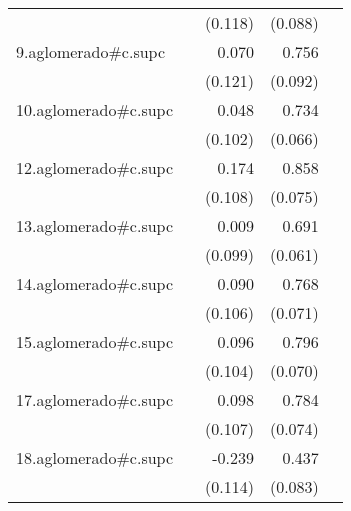 {\begin{longtable}{l*{4}{D{.}{.}{-1}}}
            &                     &     (0.118)         &     (0.088)         &                     \\
\addlinespace
9.aglomerado#c.supc&                     &       0.070         &       0.756\sym{***}&                     \\
            &                     &     (0.121)         &     (0.092)         &                     \\
\addlinespace
10.aglomerado#c.supc&                     &       0.048         &       0.734\sym{***}&                     \\
            &                     &     (0.102)         &     (0.066)         &                     \\
\addlinespace
12.aglomerado#c.supc&                     &       0.174         &       0.858\sym{***}&                     \\
            &                     &     (0.108)         &     (0.075)         &                     \\
\addlinespace
13.aglomerado#c.supc&                     &       0.009         &       0.691\sym{***}&                     \\
            &                     &     (0.099)         &     (0.061)         &                     \\
\addlinespace
14.aglomerado#c.supc&                     &       0.090         &       0.768\sym{***}&                     \\
            &                     &     (0.106)         &     (0.071)         &                     \\
\addlinespace
15.aglomerado#c.supc&                     &       0.096         &       0.796\sym{***}&                     \\
            &                     &     (0.104)         &     (0.070)         &                     \\
\addlinespace
17.aglomerado#c.supc&                     &       0.098         &       0.784\sym{***}&                     \\
            &                     &     (0.107)         &     (0.074)         &                     \\
\addlinespace
18.aglomerado#c.supc&                     &      -0.239\sym{*}  &       0.437\sym{***}&                     \\
            &                     &     (0.114)         &     (0.083)         &                     \\

\end{longtable}}
